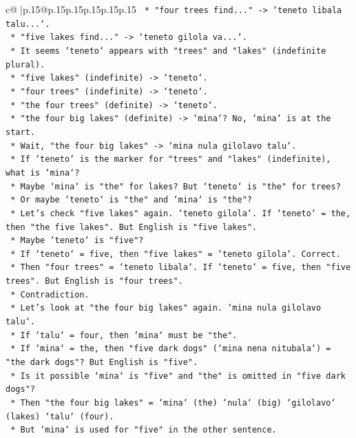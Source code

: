 \documentclass{article}
\begin{document}
{\begin{supertabular}{c@{$\;$}|p{.15\linewidth}@{}p{.15\linewidth}p{.15\linewidth}p{.15\linewidth}p{.15\linewidth}p{.15\linewidth}}
{{{\texttt{    *   "four trees find..." {-}> `teneto libala talu...`.} \\
\texttt{    *   "five lakes find..." {-}> `teneto gilola va...`.} \\
\texttt{    *   It seems `teneto` appears with "trees" and "lakes" (indefinite plural).} \\
\texttt{    *   "five lakes" (indefinite) {-}> `teneto`.} \\
\texttt{    *   "four trees" (indefinite) {-}> `teneto`.} \\
\texttt{    *   "the four trees" (definite) {-}> `teneto`.} \\
\texttt{    *   "the four big lakes" (definite) {-}> `mina`? No, `mina` is at the start.} \\
\texttt{    *   Wait, "the four big lakes" {-}> `mina nula gilolavo talu`.} \\
\texttt{    *   If `teneto` is the marker for "trees" and "lakes" (indefinite), what is `mina`?} \\
\texttt{    *   Maybe `mina` is "the" for lakes? But `teneto` is "the" for trees?} \\
\texttt{    *   Or maybe `teneto` is "the" and `mina` is "the"?} \\
\texttt{    *   Let's check "five lakes" again. `teneto gilola`. If `teneto` = the, then "the five lakes". But English is "five lakes".} \\
\texttt{    *   Maybe `teneto` is "five"?} \\
\texttt{    *   If `teneto` = five, then "five lakes" = `teneto gilola`. Correct.} \\
\texttt{    *   Then "four trees" = `teneto libala`. If `teneto` = five, then "five trees". But English is "four trees".} \\
\texttt{    *   Contradiction.} \\
\texttt{    *   Let's look at "the four big lakes" again. `mina nula gilolavo talu`.} \\
\texttt{    *   If `talu` = four, then `mina` must be "the".} \\
\texttt{    *   If `mina` = the, then "five dark dogs" (`mina nena nitubala`) = "the dark dogs"? But English is "five".} \\
\texttt{    *   Is it possible `mina` is "five" and "the" is omitted in "five dark dogs"?} \\
\texttt{    *   Then "the four big lakes" = `mina` (the) `nula` (big) `gilolavo` (lakes) `talu` (four).} \\
\texttt{    *   But `mina` is used for "five" in the other sentence.} \\
}}}
\end{supertabular}}
\end{document}
